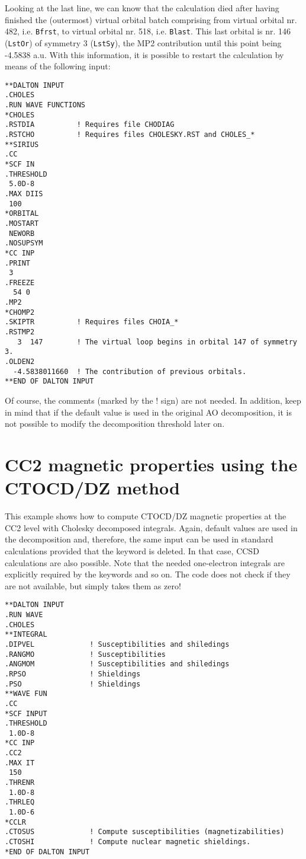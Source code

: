 Looking at the last line, we can know that the calculation died after having
finished the (outermost) virtual orbital batch comprising from virtual
orbital nr. 482, i.e. \verb|Bfrst|, to virtual orbital nr. 518, i.e.
\verb|Blast|. This last orbital is nr. 146 (\verb|LstOr|) of symmetry
3 (\verb|LstSy|), the MP2 contribution until this point being -4.5838 a.u.
With this information, it is possible to restart the calculation by means
of the following input:

\begin{verbatim}
**DALTON INPUT
.CHOLES
.RUN WAVE FUNCTIONS
*CHOLES
.RSTDIA          ! Requires file CHODIAG
.RSTCHO          ! Requires files CHOLESKY.RST and CHOLES_*
**SIRIUS
.CC
*SCF IN
.THRESHOLD
 5.0D-8
.MAX DIIS
 100
*ORBITAL
.MOSTART
 NEWORB
.NOSUPSYM
*CC INP
.PRINT
 3
.FREEZE
  54 0
.MP2
*CHOMP2
.SKIPTR          ! Requires files CHOIA_*
.RSTMP2
   3  147        ! The virtual loop begins in orbital 147 of symmetry 3.
.OLDEN2
  -4.5838011660  ! The contribution of previous orbitals.
**END OF DALTON INPUT
\end{verbatim}

Of course, the comments (marked by the ! sign) are not needed. In
addition, keep in mind that if the default value  is
used in the original AO decomposition, it is not possible to modify the
decomposition threshold later on.


\section{CC2 magnetic properties using the CTOCD/DZ method}
This example shows how to compute CTOCD/DZ magnetic properties
at the CC2 level with Cholesky decomposed integrals. Again, 
default values are used in the decomposition and, therefore, the
same input can be used in standard calculations provided that the 
keyword  is deleted. In that case, CCSD calculations 
are also possible. Note that the needed one-electron integrals
are explicitly required by the keywords  and so on.
The code does not check if they are not available, but simply
takes them as zero!

\begin{verbatim}
**DALTON INPUT
.RUN WAVE
.CHOLES
**INTEGRAL
.DIPVEL             ! Susceptibilities and shiledings
.RANGMO             ! Susceptibilities
.ANGMOM             ! Susceptibilities and shiledings
.RPSO               ! Shieldings
.PSO                ! Shieldings
**WAVE FUN
.CC
*SCF INPUT
.THRESHOLD
 1.0D-8
*CC INP
.CC2
.MAX IT
 150
.THRENR
 1.0D-8
.THRLEQ
 1.0D-6
*CCLR
.CTOSUS             ! Compute susceptibilities (magnetizabilities)
.CTOSHI             ! Compute nuclear magnetic shieldings.
*END OF DALTON INPUT
\end{verbatim}


